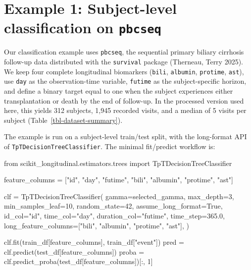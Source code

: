 \documentclass[
  letterpaper,
  DIV=11,
  numbers=noendperiod]{scrartcl}
\newenvironment{Shaded}{\begin{snugshade}}{\end{snugshade}}
\newcommand{\DecValTok}[1]{\textcolor[rgb]{0.68,0.00,0.00}{#1}}
\newcommand{\FloatTok}[1]{\textcolor[rgb]{0.68,0.00,0.00}{#1}}
\newcommand{\ImportTok}[1]{\textcolor[rgb]{0.00,0.46,0.62}{#1}}
\newcommand{\NormalTok}[1]{\textcolor[rgb]{0.00,0.23,0.31}{#1}}
\newcommand{\OperatorTok}[1]{\textcolor[rgb]{0.37,0.37,0.37}{#1}}
\newcommand{\StringTok}[1]{\textcolor[rgb]{0.13,0.47,0.30}{#1}}
\newcommand{\VariableTok}[1]{\textcolor[rgb]{0.07,0.07,0.07}{#1}}
\begin{document}
\section{\texorpdfstring{Example 1: Subject-level classification on
\texttt{pbcseq}}{Example 1: Subject-level classification on pbcseq}}\label{example-1-subject-level-classification-on-pbcseq}

Our classification example uses \texttt{pbcseq}, the sequential primary
biliary cirrhosis follow-up data distributed with the \texttt{survival}
package (Therneau, Terry 2025). We keep four complete longitudinal
biomarkers (\texttt{bili}, \texttt{albumin}, \texttt{protime},
\texttt{ast}), use \texttt{day} as the observation-time variable,
\texttt{futime} as the subject-specific horizon, and define a binary
target equal to one when the subject experiences either transplantation
or death by the end of follow-up. In the processed version used here,
this yields 312 subjects, 1,945 recorded visits, and a median of 5
visits per subject (Table~\ref{tbl-dataset-summary}).

The example is run on a subject-level train/test split, with the
long-format API of \texttt{TpTDecisionTreeClassifier}. The minimal
fit/predict workflow is:

\begin{Shaded}
\begin{Highlighting}[]
\ImportTok{from}\NormalTok{ scikit\_longitudinal.estimators.trees }\ImportTok{import}\NormalTok{ TpTDecisionTreeClassifier}

\NormalTok{feature\_columns }\OperatorTok{=}\NormalTok{ [}\StringTok{"id"}\NormalTok{, }\StringTok{"day"}\NormalTok{, }\StringTok{"futime"}\NormalTok{, }\StringTok{"bili"}\NormalTok{, }\StringTok{"albumin"}\NormalTok{, }\StringTok{"protime"}\NormalTok{, }\StringTok{"ast"}\NormalTok{]}

\NormalTok{clf }\OperatorTok{=}\NormalTok{ TpTDecisionTreeClassifier(}
\NormalTok{    gamma}\OperatorTok{=}\NormalTok{selected\_gamma,}
\NormalTok{    max\_depth}\OperatorTok{=}\DecValTok{3}\NormalTok{,}
\NormalTok{    min\_samples\_leaf}\OperatorTok{=}\DecValTok{10}\NormalTok{,}
\NormalTok{    random\_state}\OperatorTok{=}\DecValTok{42}\NormalTok{,}
\NormalTok{    assume\_long\_format}\OperatorTok{=}\VariableTok{True}\NormalTok{,}
\NormalTok{    id\_col}\OperatorTok{=}\StringTok{"id"}\NormalTok{,}
\NormalTok{    time\_col}\OperatorTok{=}\StringTok{"day"}\NormalTok{,}
\NormalTok{    duration\_col}\OperatorTok{=}\StringTok{"futime"}\NormalTok{,}
\NormalTok{    time\_step}\OperatorTok{=}\FloatTok{365.0}\NormalTok{,}
\NormalTok{    long\_feature\_columns}\OperatorTok{=}\NormalTok{[}\StringTok{"bili"}\NormalTok{, }\StringTok{"albumin"}\NormalTok{, }\StringTok{"protime"}\NormalTok{, }\StringTok{"ast"}\NormalTok{],}
\NormalTok{)}

\NormalTok{clf.fit(train\_df[feature\_columns], train\_df[}\StringTok{"event"}\NormalTok{])}
\NormalTok{pred }\OperatorTok{=}\NormalTok{ clf.predict(test\_df[feature\_columns])}
\NormalTok{proba }\OperatorTok{=}\NormalTok{ clf.predict\_proba(test\_df[feature\_columns])[:, }\DecValTok{1}\NormalTok{]}
\end{Highlighting}
\end{Shaded}
\end{document}

